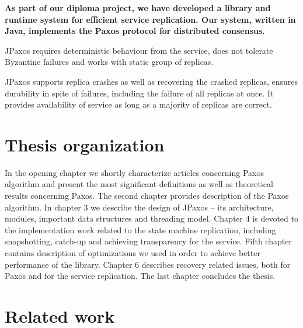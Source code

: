 %
%
%
{\bfseries
As part of our diploma project, we have developed a library and runtime system for efficient service replication. Our system, written in Java, implements the Paxos protocol \cite{Lam98} for distributed consensus.

JPaxos requires deterministic behaviour from the service, does not tolerate Byzantine failures and works with static group of replicas.

JPaxos supports replica crashes as well as recovering the crashed replicas, \linebreak ensures durability in spite of failures, including the failure of all replicas at once. \linebreak It provides availability of service as long as a majority of replicas are correct.
}

\section{Thesis organization}

In the opening chapter we shortly characterize articles concerning Paxos algorithm and present the most significant definitions as well as theoretical results concerning Paxos.
The second chapter provides description of the Paxos algorithm.
In chapter 3 we describe the design of JPaxos -- its architecture, modules, important data structures and threading model.
Chapter 4 is devoted to the implementation work related to the state machine replication, including snapshotting, catch-up and achieving transparency for the service.
Fifth chapter contains description of optimizations we used in order to achieve better performance of the library.
Chapter 6 describes recovery related issues, both for Paxos and for the service replication.
The last chapter concludes the thesis.

\section{Related work}

